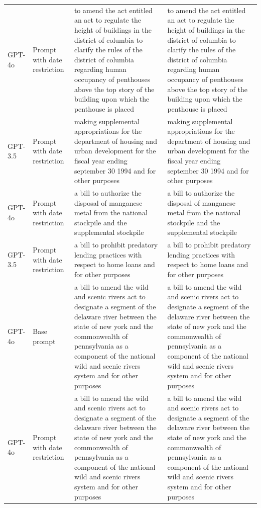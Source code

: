 \begin{longtable}{>{\raggedright\arraybackslash}p{1.4cm}>{\raggedright\arraybackslash}p{1.4cm}>{\raggedright\arraybackslash}p{5.5cm}>{\raggedright\arraybackslash}p{5.5cm}}
GPT-4o & Prompt with date restriction & to amend the act entitled an act to regulate the height of buildings in the district of columbia to clarify the rules of the district of columbia regarding human occupancy of penthouses above the top story of the building upon which the penthouse is placed & to amend the act entitled an act to regulate the height of buildings in the district of columbia to clarify the rules of the district of columbia regarding human occupancy of penthouses above the top story of the building upon which the penthouse is placed\\
GPT-3.5 & Prompt with date restriction & making supplemental appropriations for the department of housing and urban development for the fiscal year ending september 30 1994 and for other purposes & making supplemental appropriations for the department of housing and urban development for the fiscal year ending september 30 1994 and for other purposes\\
GPT-4o & Prompt with date restriction & a bill to authorize the disposal of manganese metal from the national stockpile and the supplemental stockpile & a bill to authorize the disposal of manganese metal from the national stockpile and the supplemental stockpile\\
GPT-3.5 & Prompt with date restriction & a bill to prohibit predatory lending practices with respect to home loans and for other purposes & a bill to prohibit predatory lending practices with respect to home loans and for other purposes\\
GPT-4o & Base prompt & a bill to amend the wild and scenic rivers act to designate a segment of the delaware river between the state of new york and the commonwealth of pennsylvania as a component of the national wild and scenic rivers system and for other purposes & a bill to amend the wild and scenic rivers act to designate a segment of the delaware river between the state of new york and the commonwealth of pennsylvania as a component of the national wild and scenic rivers system and for other purposes\\
GPT-4o & Prompt with date restriction & a bill to amend the wild and scenic rivers act to designate a segment of the delaware river between the state of new york and the commonwealth of pennsylvania as a component of the national wild and scenic rivers system and for other purposes & a bill to amend the wild and scenic rivers act to designate a segment of the delaware river between the state of new york and the commonwealth of pennsylvania as a component of the national wild and scenic rivers system and for other purposes\\

\end{longtable}
